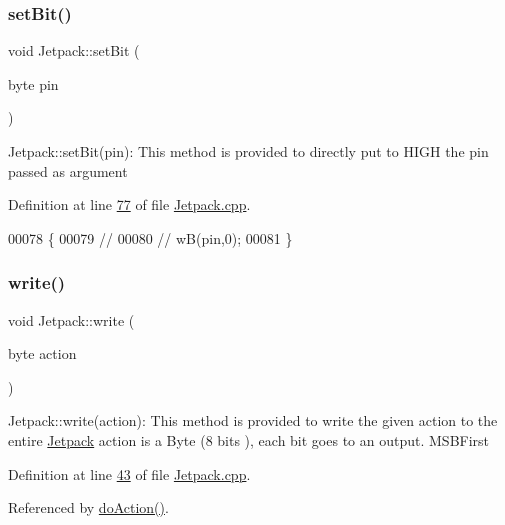 \subsubsection{\texorpdfstring{set\+Bit()}{setBit()}}
{\footnotesize\ttfamily void Jetpack\+::set\+Bit (\begin{DoxyParamCaption}\item[{byte}]{pin }\end{DoxyParamCaption})\hspace{0.3cm}{\ttfamily [static]}}

Jetpack\+::set\+Bit(pin)\+: This method is provided to directly put to H\+I\+GH the pin passed as argument 

Definition at line \hyperlink{_jetpack_8cpp_source_l00077}{77} of file \hyperlink{_jetpack_8cpp_source}{Jetpack.\+cpp}.


\begin{DoxyCode}
00078 \{
00079 \textcolor{comment}{//  }
00080 \textcolor{comment}{//  wB(pin,0);}
00081 \}   
\end{DoxyCode}
\mbox{\label{class_jetpack_a338f1af8cbc6504ac69b47c7328569b5}} 
\subsubsection{\texorpdfstring{write()}{write()}}
{\footnotesize\ttfamily void Jetpack\+::write (\begin{DoxyParamCaption}\item[{byte}]{action }\end{DoxyParamCaption})}

Jetpack\+::write(action)\+: This method is provided to write the given action to the entire \hyperlink{class_jetpack}{Jetpack} action is a Byte (8 bits ), each bit goes to an output. M\+S\+B\+First 

Definition at line \hyperlink{_jetpack_8cpp_source_l00043}{43} of file \hyperlink{_jetpack_8cpp_source}{Jetpack.\+cpp}.



Referenced by \hyperlink{_jetpack_8cpp_source_l00114}{do\+Action()}.


